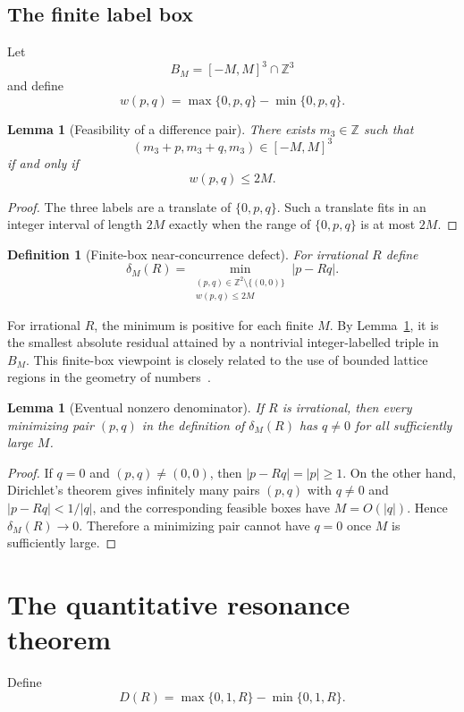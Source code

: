 \documentclass[11pt,a4paper]{article}
\newcommand{\deltam}{\delta_M}
\newtheorem{lemma}[theorem]{Lemma}
\newtheorem{definition}[theorem]{Definition}
\begin{document}
\subsection{The finite label box}
Let
\[
B_M=[-M,M]^3\cap\mathbb Z^3
\]
and define
\[
w(p,q)=\max\{0,p,q\}-\min\{0,p,q\}.
\]

\begin{lemma}[Feasibility of a difference pair]\label{lem:feas}
There exists $m_3\in\mathbb Z$ such that
\[
(m_3+p,m_3+q,m_3)\in[-M,M]^3
\]
if and only if
\[
w(p,q)\le2M.
\]
\end{lemma}

\begin{proof}
The three labels are a translate of $\{0,p,q\}$. Such a translate fits in an integer interval of
length $2M$ exactly when the range of $\{0,p,q\}$ is at most $2M$.
\end{proof}

\begin{definition}[Finite-box near-concurrence defect]\label{def:delta}
For irrational $R$ define
\[
\boxed{
\deltam(R)=
\min_{\substack{(p,q)\in\mathbb Z^2\setminus\{(0,0)\}\\
w(p,q)\le2M}}
|p-Rq|.
}
\]
\end{definition}

For irrational $R$, the minimum is positive for each finite $M$. By Lemma~\ref{lem:feas}, it is the smallest absolute residual attained by a nontrivial integer-labelled triple in $B_M$. This finite-box viewpoint is closely related to the use of bounded lattice regions in the geometry of numbers~\cite{casselsgeometry,gruberlekkerkerker}.

\begin{lemma}[Eventual nonzero denominator]\label{lem:qnonzero}
If $R$ is irrational, then every minimizing pair $(p,q)$ in the definition of $\deltam(R)$ has
$q\ne0$ for all sufficiently large $M$.
\end{lemma}

\begin{proof}
If $q=0$ and $(p,q)\ne(0,0)$, then $|p-Rq|=|p|\ge1$. On the other hand, Dirichlet's theorem
gives infinitely many pairs $(p,q)$ with $q\ne0$ and $|p-Rq|<1/|q|$, and the corresponding
feasible boxes have $M=O(|q|)$. Hence $\deltam(R)\to0$. Therefore a minimizing pair cannot have
$q=0$ once $M$ is sufficiently large.
\end{proof}

\section{The quantitative resonance theorem}
Define
\[
D(R)=\max\{0,1,R\}-\min\{0,1,R\}.
\]
\end{document}
